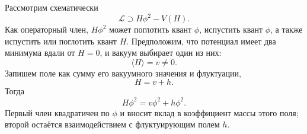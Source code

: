 Рассмотрим схематически
\begin{equation}
\mathcal L\supset H\phi^2-V(H).
\end{equation}
Как операторный член, \(H\phi^2\) может поглотить квант \(\phi\), испустить квант \(\phi\), а также испустить или поглотить квант \(H\). Предположим, что потенциал имеет два минимума вдали от \(H=0\), и вакуум выбирает один из них:
\begin{equation}
\langle H\rangle=v\ne0.
\end{equation}
Запишем поле как сумму его вакуумного значения и флуктуации,
\begin{equation}
H=v+h.
\end{equation}
Тогда
\begin{equation}
H\phi^2=v\phi^2+h\phi^2.
\end{equation}
Первый член квадратичен по \(\phi\) и вносит вклад в коэффициент массы этого поля; второй остаётся взаимодействием с флуктуирующим полем \(h\).

\begin{classroomqa}
\end{classroomqa}